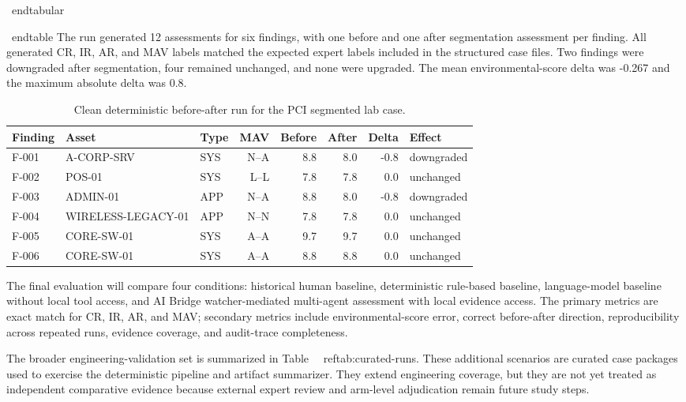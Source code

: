 \
end{tabular}

\
end{table}
The run generated 12 assessments for six findings, with one before and one after segmentation assessment per finding. All generated CR, IR, AR, and MAV labels matched the expected expert labels included in the structured case files. Two findings were downgraded after segmentation, four remained unchanged, and none were upgraded. The mean environmental-score delta was -0.267 and the maximum absolute delta was 0.8.

\begin{table}[ht]
\centering
\caption{Clean deterministic before-after run for the PCI segmented lab case.}
\label{tab:clean-run-effects}
\begin{tabular}{lllrrrrl}
\toprule
Finding & Asset & Type & MAV & Before & After & Delta & Effect \\
\midrule
F-001 & A-CORP-SRV & SYS & N--A & 8.8 & 8.0 & -0.8 & downgraded \\
F-002 & POS-01 & SYS & L--L & 7.8 & 7.8 & 0.0 & unchanged \\
F-003 & ADMIN-01 & APP & N--A & 8.8 & 8.0 & -0.8 & downgraded \\
F-004 & WIRELESS-LEGACY-01 & APP & N--N & 7.8 & 7.8 & 0.0 & unchanged \\
F-005 & CORE-SW-01 & SYS & A--A & 9.7 & 9.7 & 0.0 & unchanged \\
F-006 & CORE-SW-01 & SYS & A--A & 8.8 & 8.8 & 0.0 & unchanged \\
\bottomrule
\end{tabular}
\end{table}

The final evaluation will compare four conditions: historical human baseline, deterministic rule-based baseline, language-model baseline without local tool access, and AI Bridge watcher-mediated multi-agent assessment with local evidence access. The primary metrics are exact match for CR, IR, AR, and MAV; secondary metrics include environmental-score error, correct before-after direction, reproducibility across repeated runs, evidence coverage, and audit-trace completeness.





The broader engineering-validation set is summarized in Table~
\
ref{tab:curated-runs}. These additional scenarios are curated case packages used to exercise the deterministic pipeline and artifact summarizer. They extend engineering coverage, but they are not yet treated as independent comparative evidence because external expert review and arm-level adjudication remain future study steps.


